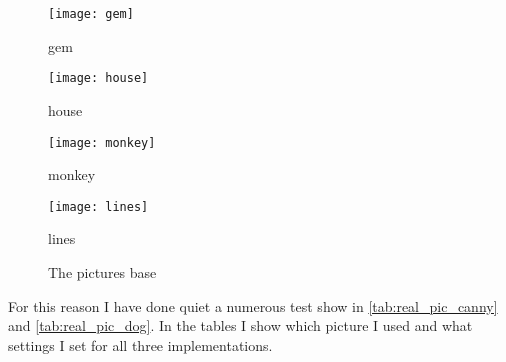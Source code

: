 \begin{figure}[H]
\centering
\begin{minipage}[t]{.49\textwidth}
\centering
\texttt{[image: gem]}
\addtocounter{figure}{-1}
\captionsetup{labelformat=empty}
\caption[]{gem}
\end{minipage}
\begin{minipage}[t]{.49\textwidth}
\centering
\texttt{[image: house]}
\addtocounter{figure}{-1}
\captionsetup{labelformat=empty}
\caption[]{house}
\end{minipage}
\begin{minipage}[t]{.49\textwidth}
\centering
\texttt{[image: monkey]}
\addtocounter{figure}{-1}
\captionsetup{labelformat=empty}
\caption[]{monkey}
\end{minipage}
\begin{minipage}[t]{.49\textwidth}
\centering
\texttt{[image: lines]}
\addtocounter{figure}{-1}
\captionsetup{labelformat=empty}
\caption[]{lines}
\end{minipage}
\caption{The pictures base}
\label{fig:pictures}
\end{figure}

 For this reason I have done quiet a numerous test show in \autoref{tab:real_pic_canny} and \autoref{tab:real_pic_dog}. In the tables I show which picture I used and what settings I set for all three implementations.

\begin{table}[H]
\centering
{}
\caption{Test plans for the Real picture tester for \ac{Canny} algorithm}
\label{tab:real_pic_canny}
\end{table}

